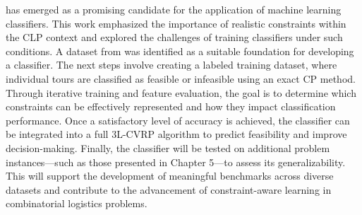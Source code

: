 has emerged as a promising candidate for the application of machine learning classifiers. This work
emphasized the importance of realistic constraints within the \gls{CLP} context and explored the challenges
of training classifiers under such conditions. A dataset from \citeauthor*{krebs_advanced_2021} was
identified as a suitable foundation for developing a classifier. The next steps involve creating a labeled
training dataset, where individual tours are classified as feasible or infeasible using an exact \gls{CP}
method. Through iterative training and feature evaluation, the goal is to determine which constraints can
be effectively represented and how they impact classification performance. Once a satisfactory level of
accuracy is achieved, the classifier can be integrated into a full \gls{3L-CVRP} algorithm to predict
feasibility and improve decision-making. Finally, the classifier will be tested on additional problem
instances—such as those presented in Chapter 5—to assess its generalizability. This will support the
development of meaningful benchmarks across diverse datasets and contribute to the advancement of
constraint-aware learning in combinatorial logistics problems.